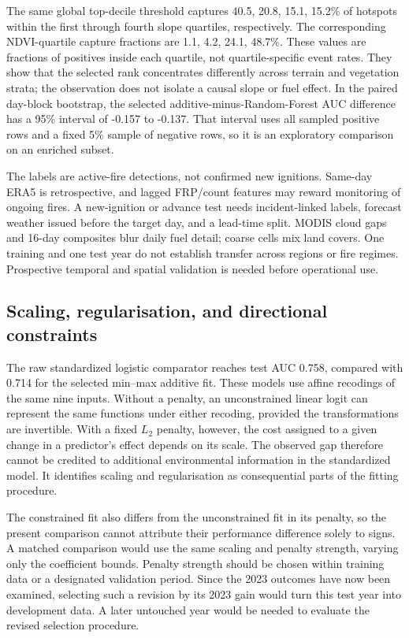 \documentclass[conference]{IEEEtran}
\begin{document}
The same global top-decile threshold captures 40.5, 20.8, 15.1, 15.2\% of hotspots within the first through fourth slope quartiles, respectively. The corresponding NDVI-quartile capture fractions are 1.1, 4.2, 24.1, 48.7\%. These values are fractions of positives inside each quartile, not quartile-specific event rates. They show that the selected rank concentrates differently across terrain and vegetation strata; the observation does not isolate a causal slope or fuel effect. In the paired day-block bootstrap, the selected additive-minus-Random-Forest AUC difference has a 95\% interval of -0.157 to -0.137. That interval uses all sampled positive rows and a fixed 5\% sample of negative rows, so it is an exploratory comparison on an enriched subset.

The labels are active-fire detections, not confirmed new ignitions. Same-day ERA5 is retrospective, and lagged FRP/count features may reward monitoring of ongoing fires. A new-ignition or advance test needs incident-linked labels, forecast weather issued before the target day, and a lead-time split. MODIS cloud gaps and 16-day composites blur daily fuel detail; coarse cells mix land covers. One training and one test year do not establish transfer across regions or fire regimes. Prospective temporal and spatial validation is needed before operational use.

\subsection{Scaling, regularisation, and directional constraints}
The raw standardized logistic comparator reaches test AUC 0.758, compared with 0.714 for the selected min--max additive fit. These models use affine recodings of the same nine inputs. Without a penalty, an unconstrained linear logit can represent the same functions under either recoding, provided the transformations are invertible. With a fixed $L_2$ penalty, however, the cost assigned to a given change in a predictor's effect depends on its scale. The observed gap therefore cannot be credited to additional environmental information in the standardized model. It identifies scaling and regularisation as consequential parts of the fitting procedure.

The constrained fit also differs from the unconstrained fit in its penalty, so the present comparison cannot attribute their performance difference solely to signs. A matched comparison would use the same scaling and penalty strength, varying only the coefficient bounds. Penalty strength should be chosen within training data or a designated validation period. Since the 2023 outcomes have now been examined, selecting such a revision by its 2023 gain would turn this test year into development data. A later untouched year would be needed to evaluate the revised selection procedure.
\end{document}
